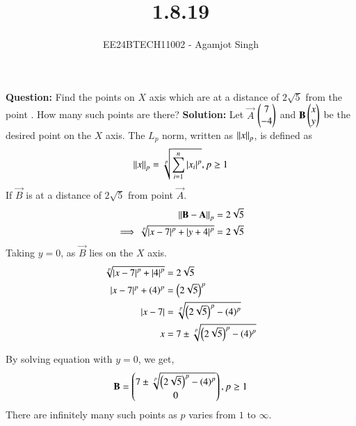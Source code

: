 \documentclass[journal]{IEEEtran}
\begin{document}

\vspace{3cm}

\title{1.8.19}
\author{EE24BTECH11002 - Agamjot Singh}
{\let\newpage\relax\maketitle}
\renewcommand{\thefigure}{\theenumi}
\renewcommand{\thetable}{\theenumi}
\setlength{\intextsep}{10pt} %

\textbf{Question:}
\newline
Find the points on $X$ axis which are at a distance of $2\sqrt{5}$ from the point . How many such points are there?
\newline
\textbf{Solution:}
\newline
Let $\vec{A}$ $\begin{pmatrix}7\\-4\end{pmatrix}$ and $\mathbf{B} \begin{pmatrix}x\\y\end{pmatrix}$ be the desired point on the $X$ axis.
\newline
The $L_p$ norm, written as $\left\lVert x\right\rVert_p$, is defined as
\begin{align}
	\left\lVert x\right\rVert_p = \sqrt[p]{\sum_{i=1}^{n}\left\vert x_i\right\vert^p}, p\geq 1
\end{align}
If $\vec{B}$ is at a distance of $2\sqrt{5}$ from point $\vec{A}$.
\begin{align}
	\left\lVert\mathbf{B} - \mathbf{A}\right\rVert_p &= 2\sqrt{5}\\
	\implies \sqrt[p]{\left\vert x - 7\right\vert^p + \left\vert y + 4\right\vert^p} &= 2\sqrt{5}\\
\end{align}
Taking $y = 0$, as $\vec{B}$ lies on the $X$ axis.
\begin{align}
	\sqrt[p]{\left\vert x - 7\right\vert^p + \left\vert4\right\vert^p} &= 2\sqrt{5}\\
	\left\vert x - 7\right\vert^p + \left(4\right)^p &= \left(2\sqrt{5}\right)^p\\
	\left\vert x - 7\right\vert &= \sqrt[p]{\left(2\sqrt{5}\right)^p - \left(4\right)^p}\\
	x &= 7 \pm \sqrt[p]{\left(2\sqrt{5}\right)^p - \left(4\right)^p}
\end{align}

By solving equation  with $y = 0$, we get,
\begin{align}
	\mathbf{B} = \begin{pmatrix}7 \pm \sqrt[p]{\left(2\sqrt{5}\right)^p - \left(4\right)^p}\\0\end{pmatrix}, p \geq 1 
\end{align} 
There are infinitely many such points as $p$ varies from $1$ to $\infty$.
\end{document}
